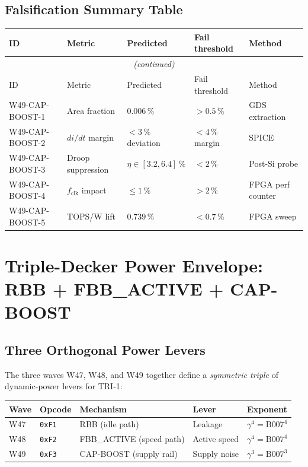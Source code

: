 \documentclass[12pt,a4paper]{report}
\theoremstyle{plain}
\theoremstyle{definition}
\theoremstyle{remark}
\newcommand{\fclk}{f_{\mathrm{clk}}}
\newcommand{\Bseven}{\mathrm{B007}}
\begin{document}
\subsection{Falsification Summary Table}
\label{ssec:falsification-summary}

\begin{center}
\begin{longtable}{lllll}
  \toprule
  ID & Metric & Predicted & Fail threshold & Method \\
  \midrule
  \endfirsthead
  \multicolumn{5}{c}{\small\itshape (continued)}\\
  \toprule
  ID & Metric & Predicted & Fail threshold & Method \\
  \midrule
  \endhead
  W49-CAP-BOOST-1 & Area fraction & $0.006\,\%$ & $> 0.5\,\%$ & GDS extraction \\
  W49-CAP-BOOST-2 & $di/dt$ margin & $< 3\,\%$ deviation & $< 4\,\%$ margin & SPICE \\
  W49-CAP-BOOST-3 & Droop suppression & $\eta \in [3.2, 6.4]\,\%$ & $< 2\,\%$ & Post-Si probe \\
  W49-CAP-BOOST-4 & $\fclk$ impact & $\leq 1\,\%$ & $> 2\,\%$ & FPGA perf counter \\
  W49-CAP-BOOST-5 & TOPS/W lift & $0.739\,\%$ & $< 0.7\,\%$ & FPGA sweep \\
  \bottomrule
\end{longtable}
\end{center}

\section{Triple-Decker Power Envelope: RBB + FBB\_ACTIVE + CAP-BOOST}
\label{sec:triple-decker}

\subsection{Three Orthogonal Power Levers}
\label{ssec:three-orthogonal}

The three waves W47, W48, and W49 together define a
\emph{symmetric triple} of dynamic-power levers for TRI-1:

\begin{center}
\begin{tabular}{lllll}
  \toprule
  Wave & Opcode & Mechanism & Lever & Exponent \\
  \midrule
  W47 & \texttt{0xF1} & RBB (idle path) & Leakage & $\gamma^{4} = \Bseven^{4}$ \\
  W48 & \texttt{0xF2} & FBB\_ACTIVE (speed path) & Active speed & $\gamma^{4} = \Bseven^{4}$ \\
  W49 & \texttt{0xF3} & CAP-BOOST (supply rail) & Supply noise & $\gamma^{3} = \Bseven^{3}$ \\
  \bottomrule
\end{tabular}
\end{center}
\end{document}
